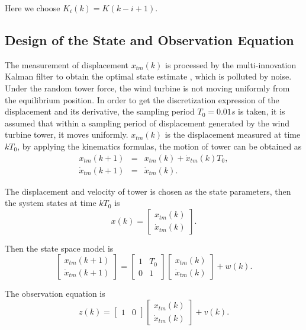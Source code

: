 \documentclass{article}
\begin{document}
Here we choose $K_i(k) = K(k-i+1)$.

\subsection{Design of the State and Observation Equation}

The measurement of displacement $x_{tm}(k)$ is processed by the multi-innovation
Kalman filter to obtain the optimal state estimate
, which is polluted by noise. Under the random tower force, the wind turbine
is not moving uniformly from the equilibrium position. In order to get the
discretization expression of the displacement and its derivative, the sampling
period $T_0=0.01s$ is taken, it is assumed that within a sampling period of
displacement generated by the wind turbine tower, it moves uniformly.
$x_{tm}(k)$ is the displacement measured at time $kT_0$, by applying the
kinematics formulas, the motion of tower can be obtained as
\begin{eqnarray}
  x_{tm}(k+1) &=& x_{tm}(k) + \dot{x}_{tm}(k)T_0, \\
  \dot{x}_{tm}(k+1) &=& \dot{x}_{tm}(k).
\end{eqnarray}

The displacement and velocity of tower is chosen as the state parameters, then
the system states at time $kT_0$ is
\begin{equation}
  x(k) =
  \begin{bmatrix}
    x_{tm}(k) \\
    \dot{x}_{tm}(k)
  \end{bmatrix}.
\end{equation}

Then the state space model is
\begin{equation}
  \begin{bmatrix}
    x_{tm}(k+1) \\
    \dot{x}_{tm}(k+1)
  \end{bmatrix}
  =
  \begin{bmatrix}
    1 & T_0 \\
    0 & 1
  \end{bmatrix}
  \begin{bmatrix}
    x_{tm}(k) \\
    \dot{x}_{tm}(k)
  \end{bmatrix} + w(k).
\end{equation}

The observation equation is
\begin{equation}
  z(k) =
  \begin{bmatrix}
    1 & 0
  \end{bmatrix}
  \begin{bmatrix}
    x_{tm}(k) \\
    \dot{x}_{tm}(k)
  \end{bmatrix} + v(k).
\end{equation}
\end{document}
